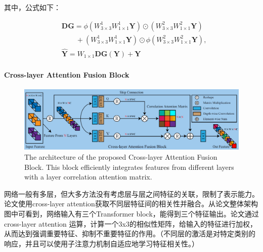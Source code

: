 \documentclass[letterpaper,10pt]{article}
\begin{document}
	其中，公式如下：
	
	\begin{equation}
		\begin{aligned}
			& \mathbf{DG} = \phi \left(W_{3\times 3}^1 W_{1\times1}^1 \mathbf{Y} \right) \odot \left(W_{3\times3}^2 W_{1\times1}^2\mathbf{Y} \right)\\ 
			& \quad \quad  + \left(W_{3\times3}^1W_{1\times1}^1\mathbf{Y}\right) \odot \phi \left(W_{3\times3}^2 W_{1\times1}^2 \mathbf{Y}\right), \\
			& \hat{\mathbf{Y}} = W_{1\times1}\textbf{DG}\left(\mathbf{Y}\right) + \mathbf{Y}
		\end{aligned}
		\label{eq: DGFN}
	\end{equation}
	
	\paragraph{Cross-layer Attention Fusion Block}
	
	\begin{figure}[htbp]
		\centering 
		\includegraphics[width=\columnwidth]{picture/Cross-layer_Attention_Fusion_Block}
		\captionsetup{font=scriptsize}
		\caption{
			\label{fig: Cross-layer_Attention_Fusion_Block} %
			The architecture of the proposed Cross-layer Attention Fusion Block. This block efficiently integrates features from different layers with a layer correlation attention matrix.
		}
	\end{figure}
	
	 网络一般有多层，但大多方法没有考虑层与层之间特征的关联，限制了表示能力。论文使用cross-layer attention获取不同层特征间的相关性并融合。从论文整体架构图中可看到，网络输入有三个Transformer block，能得到三个特征输出。论文通过cross-layer attention 运算，计算一个3x3的相似性矩阵，给输入的特征进行加权，从而达到强调重要特征、抑制不重要特征的作用。（不同层的激活是对特定类别的响应，并且可以使用子注意力机制自适应地学习特征相关性。）
	
\end{document}
